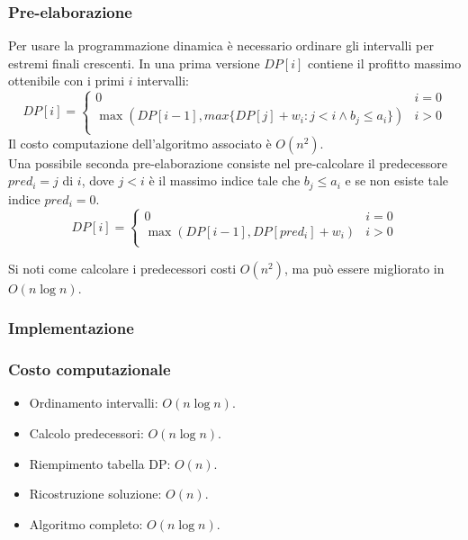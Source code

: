 \subsubsection{Pre-elaborazione}
Per usare la programmazione dinamica \`e necessario ordinare gli intervalli per estremi finali crescenti. In una prima versione $DP[i]$ contiene il profitto massimo ottenibile con i
primi $i$ intervalli:
$$DP[i] =\begin{cases}
	0 & i = 0\\
	\max(DP[i-1], max\{DP[j]+w_i: j < i \land b_j\le a_i\}) & i >0\\
\end{cases}$$
Il costo computazione dell'algoritmo associato \`e $O(n^2)$.\\
Una possibile seconda pre-elaborazione consiste nel pre-calcolare il predecessore $pred_i = j$ di $i$, dove $j < i$ \`e il massimo indice tale che $b_j\le a_i$ e se non esiste tale 
indice $pred_i = 0$. 
$$DP[i] = \begin{cases}
	0 & i = 0\\
	\max(DP[i-1], DP[pred_i]+w_i) & i > 0\\
\end{cases}$$

Si noti come calcolare i predecessori costi $O(n^2)$, ma pu\`o essere migliorato in $O(n\log n)$. 
\subsubsection{Implementazione}

\subsubsection{Costo computazionale}
\begin{itemize}
	\item Ordinamento intervalli: $O(n\log n)$.
	\item Calcolo predecessori: $O(n\log n)$.
	\item Riempimento tabella DP: $O(n)$.
	\item Ricostruzione soluzione: $O(n)$.
	\item Algoritmo completo: $O(n\log n)$.
\end{itemize}
